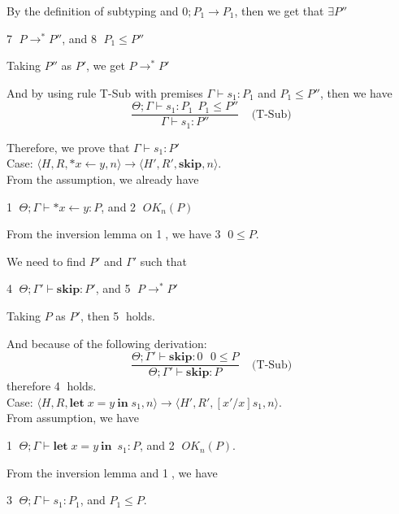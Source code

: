 \documentclass[english]{jssst_ppl} %
\newcommand\LET{\mathbf{let}\;}
\newcommand\IN{\mathbf{in}\;}
\newcommand\SKIP{\mathbf{skip}}
\newcommand\Rtab{\; \; \; \;}
\theoremstyle{definition}
\begin{document}
By the definition of subtyping and $0;P_{1} \rightarrow P_{1}$, then we get that $\exists P''$
\begin{center}
 \textcircled{7} $P \rightarrow^{*} P''$, and \textcircled{8} $P_{1} \le P''$
\end{center}

Taking $P''$ as  $P'$, we get $P \rightarrow^{*} P'$

And by using rule T-Sub with premises $\Gamma \vdash s_{1} : P_{1}$ and $P_{1} \le P''$, then we have 
$$
    \frac{\Theta; \Gamma \vdash s_{1} : P_{1} \  \  P_{1} \le P''}
    {\Gamma \vdash s_{1} : P''}
    \Rtab \mbox{(T-Sub)}
$$

Therefore, we prove that $\Gamma \vdash s_{1} : P'$ \\

\noindent Case: $\langle H, R, *x \leftarrow y , n \rangle \rightarrow  \langle H', R', \SKIP, n  \rangle $. \\

From the assumption, we already have
\begin{center}
\textcircled{1} $\Theta; \Gamma \vdash *x \leftarrow y : P$, and \textcircled{2} $OK_{n}(P)$
\end{center}

From the inversion lemma on \textcircled{1}, we have \textcircled{3} $0 \le P$.

We need to find $P'$ and $\Gamma'$ such that
\begin{center}
 \textcircled{4} $\Theta; \Gamma' \vdash \SKIP: P'$, and \textcircled{5} $P \rightarrow^{*} P'$
\end{center}

Taking $P$ as $P'$, then \textcircled{5} holds.

And because of the following derivation:
$$
  \frac{\Theta; \Gamma' \vdash \SKIP: 0 \ \ \ 0 \le P}
   {\Theta;\Gamma' \vdash \SKIP : P}
  \Rtab \mbox{(T-Sub)}
$$
therefore \textcircled{4} holds. \\

\noindent Case: $\langle H, R, \LET x = y\  \IN s_{1} , n \rangle \rightarrow  \langle H', R', [x'/x]s_{1}, n  \rangle $. \\

From assumption, we have 
\begin{center}
\textcircled{1} $\Theta; \Gamma \vdash \LET x = y\  \IN \  s_{1} : P$, and \textcircled{2} $OK_{n}(P)$.
\end{center}

From the inversion lemma and \textcircled{1}, we have 
\begin{center}
\textcircled{3} $\Theta; \Gamma \vdash s_{1} : P_{1}$, and $P_{1} \le P$.
\end{center}
\end{document}
